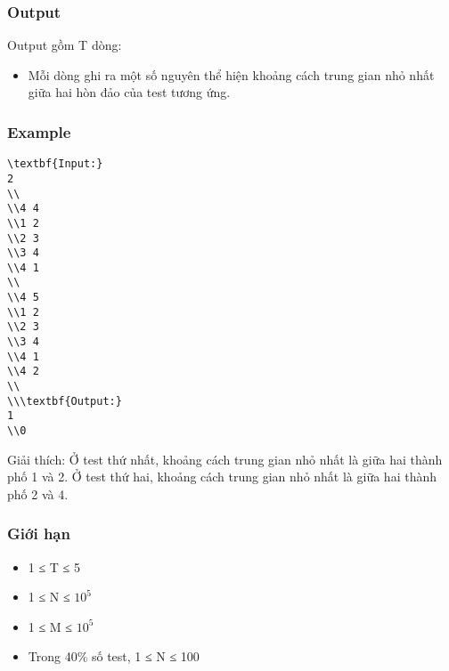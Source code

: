 \subsubsection{   Output  }

   Output gồm T dòng:  
\begin{itemize}
	\item     Mỗi dòng ghi ra một số nguyên thể hiện khoảng cách trung gian nhỏ nhất giữa hai hòn đảo của test tương ứng.   
\end{itemize}

\subsubsection{   Example  }
\begin{verbatim}
\textbf{Input:}
2
\\
\\4 4
\\1 2
\\2 3
\\3 4
\\4 1
\\
\\4 5 
\\1 2
\\2 3
\\3 4
\\4 1
\\4 2
\\
\\\textbf{Output:}
1
\\0\end{verbatim}

Giải thích: Ở test thứ nhất, khoảng cách trung gian nhỏ nhất là giữa hai thành phố 1 và 2. Ở test thứ hai, khoảng cách trung gian nhỏ nhất là giữa hai thành phố 2 và 4.

\subsubsection{   Giới hạn  }
\begin{itemize}
	\item     1 ≤ T ≤ 5   
	\item     1 ≤ N ≤ $10^{5}$
	\item     1 ≤ M ≤ $10^{5}$
	\item     Trong 40\% số test, 1 ≤ N ≤ 100   
\end{itemize}
